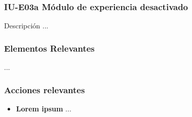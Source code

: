 
\subsubsection{IU-E03a Módulo de experiencia desactivado}

 Descripción ...


\subsubsection{Elementos Relevantes}

    \begin{description}
     ...
    \end{description}

\subsubsection{Acciones relevantes}

    \begin{itemize}
    \item {\bf Lorem ipsum}
        ...
    \end{itemize}

\clearpage
